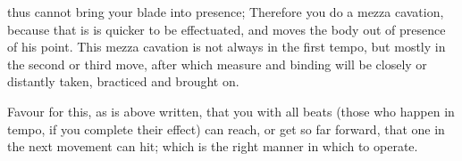 \newpage


\newpage


thus cannot bring your blade into presence; Therefore you do a mezza
cavation, because that is is quicker to be effectuated, and moves the
body out of presence of his point. This mezza cavation is not always
in the first tempo, but mostly in the second or third move, after
which measure and binding will be closely or distantly taken,
bracticed and brought on.


Favour for this, as is above written, that you with all beats (those
who happen in tempo, if you complete their effect) can reach, or get
so far forward, that one in the next movement can hit; which is the
right manner in which to operate.



